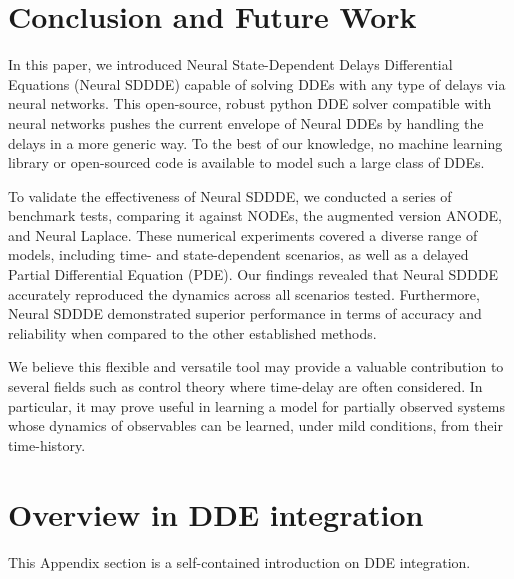 \documentclass[pmlr]{jmlr}%
\begin{document}
\section{Conclusion and Future Work}\label{sec:conclusions}

In this paper, we introduced Neural State-Dependent Delays Differential Equations (Neural SDDDE) capable of solving DDEs with any type of delays via neural networks. This open-source, robust python DDE solver compatible with neural networks pushes the current envelope of Neural DDEs by handling the delays in a more generic way. To the best of our knowledge, no machine learning library or open-sourced code is available to model such a large class of DDEs. 

To validate the effectiveness of Neural SDDDE, we conducted a series of benchmark tests, comparing it against NODEs, the augmented version ANODE, and Neural Laplace. These numerical experiments covered a diverse range of models, including time- and state-dependent scenarios, as well as a delayed Partial Differential Equation (PDE). Our findings revealed that Neural SDDDE accurately reproduced the dynamics across all scenarios tested. Furthermore, Neural SDDDE demonstrated superior performance in terms of accuracy and reliability when compared to the other established methods.

We believe this flexible and versatile tool may provide a valuable contribution to several fields such as control theory where time-delay are often considered. In particular, it may prove useful in learning a model for partially observed systems whose dynamics of observables can be learned, under mild conditions, from their time-history. 

 



\appendix


\appendix\label{sec:appendix}
\newpage


\section{Overview in DDE integration}\label{ap:dde_appendix}

This Appendix section is a self-contained introduction on DDE integration.
\end{document}
